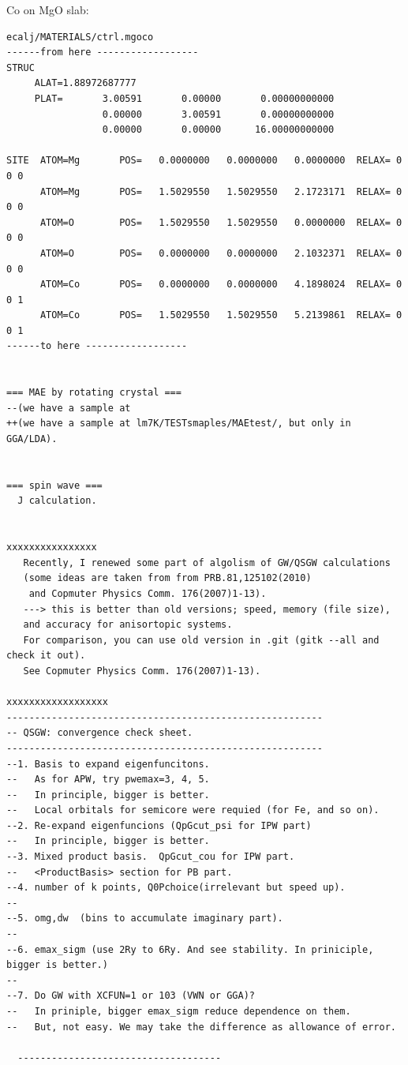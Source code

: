 \documentclass[a4paper,10pt,epsf,fleqn]{article}
\begin{document}
Co on MgO slab:
\begin{verbatim}
ecalj/MATERIALS/ctrl.mgoco
------from here ------------------
STRUC
     ALAT=1.88972687777
     PLAT=       3.00591       0.00000       0.00000000000  
                 0.00000       3.00591       0.00000000000 
                 0.00000       0.00000      16.00000000000 

SITE  ATOM=Mg       POS=   0.0000000   0.0000000   0.0000000  RELAX= 0 0 0
      ATOM=Mg       POS=   1.5029550   1.5029550   2.1723171  RELAX= 0 0 0
      ATOM=O        POS=   1.5029550   1.5029550   0.0000000  RELAX= 0 0 0
      ATOM=O        POS=   0.0000000   0.0000000   2.1032371  RELAX= 0 0 0
      ATOM=Co       POS=   0.0000000   0.0000000   4.1898024  RELAX= 0 0 1
      ATOM=Co       POS=   1.5029550   1.5029550   5.2139861  RELAX= 0 0 1
------to here ------------------


=== MAE by rotating crystal ===
--(we have a sample at
++(we have a sample at lm7K/TESTsmaples/MAEtest/, but only in GGA/LDA).


=== spin wave ===
  J calculation.
  

xxxxxxxxxxxxxxxx
   Recently, I renewed some part of algolism of GW/QSGW calculations
   (some ideas are taken from from PRB.81,125102(2010) 
    and Copmuter Physics Comm. 176(2007)1-13).
   ---> this is better than old versions; speed, memory (file size),
   and accuracy for anisortopic systems.
   For comparison, you can use old version in .git (gitk --all and check it out).
   See Copmuter Physics Comm. 176(2007)1-13).

xxxxxxxxxxxxxxxxxx
--------------------------------------------------------
-- QSGW: convergence check sheet.
--------------------------------------------------------
--1. Basis to expand eigenfuncitons. 
--   As for APW, try pwemax=3, 4, 5.
--   In principle, bigger is better.
--   Local orbitals for semicore were requied (for Fe, and so on).
--2. Re-expand eigenfuncions (QpGcut_psi for IPW part)
--   In principle, bigger is better. 
--3. Mixed product basis.  QpGcut_cou for IPW part. 
--   <ProductBasis> section for PB part.
--4. number of k points, Q0Pchoice(irrelevant but speed up).
--
--5. omg,dw  (bins to accumulate imaginary part).
--
--6. emax_sigm (use 2Ry to 6Ry. And see stability. In priniciple, bigger is better.) 
--
--7. Do GW with XCFUN=1 or 103 (VWN or GGA)?
--   In priniple, bigger emax_sigm reduce dependence on them.
--   But, not easy. We may take the difference as allowance of error.
  
  ------------------------------------
 
\end{verbatim}
\end{document}
